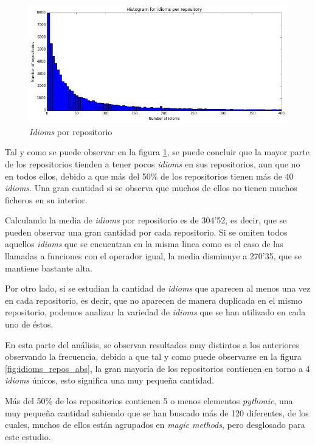 \documentclass[a4paper, 12pt]{book}
\begin{document}
\begin{figure}[t]
\centering
\includegraphics[width=140mm]{img/graphs/idioms_per_repository.png}
\caption{\textit{Idioms} por repositorio}
\label{fig:idiom_per_repo}
\end{figure}

Tal y como se puede observar en la figura \ref{fig:idiom_per_repo}, se puede concluir que la mayor parte de los repositorios tienden a tener pocos \textit{idioms} en sus repositorios, aun que no en todos ellos, debido a que más del 50\% de los repositorios tienen más de 40 \textit{idioms}. Una gran cantidad si se observa que muchos de ellos no tienen muchos ficheros en su interior.

Calculando la media de \textit{idioms} por repositorio es de 304'52, es decir, que se pueden observar una gran cantidad por cada repositorio. Si se omiten todos aquellos \textit{idioms} que se encuentran en la misma linea como es el caso de las llamadas a funciones con el operador igual, la media disminuye a 270'35, que se mantiene bastante alta.

Por otro lado, si se estudian la cantidad de \textit{idioms} que aparecen al menos una vez en cada repositorio, es decir, que no aparecen de manera duplicada en el mismo repositorio, podemos analizar la variedad de \textit{idioms} que se han utilizado en cada uno de éstos.

En esta parte del análisis, se observan resultados muy distintos a los anteriores observando la frecuencia, debido a que tal y como puede observarse en la figura \ref{fig:idioms_repos_abs}, la gran mayoría de los repositorios contienen en torno a 4 \textit{idioms} únicos, esto significa una muy pequeña cantidad.

Más del 50\% de los repositorios contienen 5 o menos elementos \textit{pythonic}, una muy pequeña cantidad sabiendo que se han buscado más de 120 diferentes, de los cuales, muchos de ellos están agrupados en \textit{magic methods}, pero desglosado para este estudio.
\end{document}

